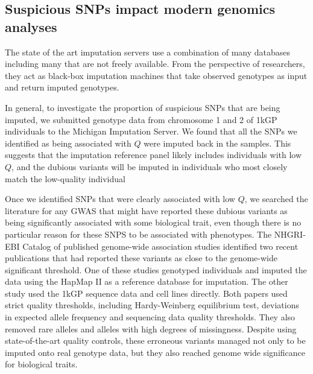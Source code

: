 \documentclass[9pt,lineno]{elife}
\begin{document}
\subsection{Suspicious SNPs impact modern genomics analyses}
The state of the art imputation servers use a combination of many databases including many that are not freely available.
From the perspective of researchers, they act as black-box imputation machines that take observed genotypes as input and return imputed genotypes.  


In general, to investigate the proportion of suspicious SNPs that are being imputed, we submitted genotype data from chromosome 1 and 2 of 1kGP individuals to the Michigan Imputation Server.
We found that all the SNPs we identified as being associated with $Q$ were imputed back in the samples. 
This suggests that the imputation reference panel likely includes individuals with low $Q$, and the dubious variants will be imputed in individuals who most closely match the low-quality individual

Once we identified SNPs that were clearly associated with low $Q$, we searched the literature for any GWAS that might have reported these dubious variants as being significantly associated with some biological trait, even though there is no particular reason for these SNPS to be associated with phenotypes.
The NHGRI-EBI Catalog of published genome-wide association studies identified two recent publications that had reported these variants as close to the genome-wide significant threshold.
One of these studies genotyped individuals and imputed the data using the HapMap II as a reference  database for imputation.
The other study used the 1kGP sequence data and cell lines directly.
Both papers used strict quality thresholds, including Hardy-Weinberg equilibrium test, deviations in expected allele frequency and sequencing data quality thresholds. 
They also removed rare alleles and alleles with high degrees of missingness. 
Despite using state-of-the-art quality controls, these erroneous variants managed not only to be imputed onto real genotype data, but they also reached genome wide significance for biological traits.
\end{document}
